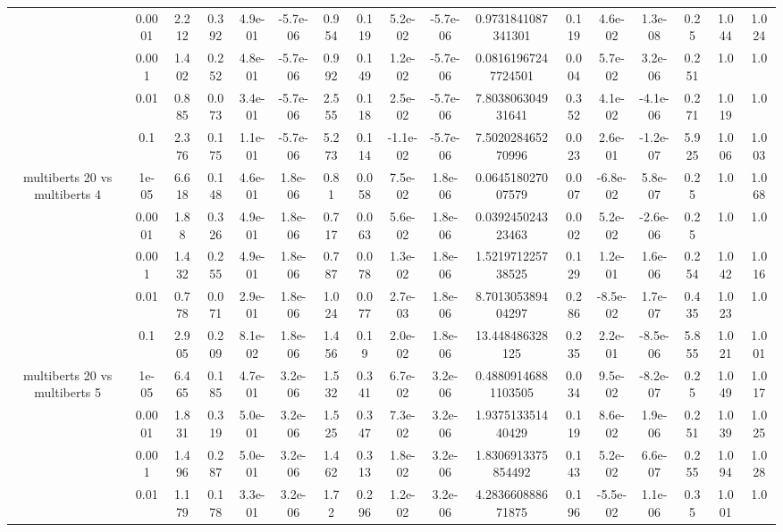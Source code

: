\begin{tabular}{|c|c|c|c|c|c|c|c|c|c|c|c|c|c|c|c|c|}
 & 0.0001 & 2.212 & 0.392 & 4.9e-01 & -5.7e-06 & 0.954 & 0.119 & 5.2e-02 & -5.7e-06 & 0.9731841087341301 & 0.119 & 4.6e-02 & 1.3e-08 & 0.25 & 1.044 & 1.024 \\
 & 0.001 & 1.402 & 0.252 & 4.8e-01 & -5.7e-06 & 0.992 & 0.149 & 1.2e-02 & -5.7e-06 & 0.08161967247724501 & 0.004 & 5.7e-02 & 3.2e-06 & 0.251 & 1.0 & 1.0 \\
 & 0.01 & 0.885 & 0.073 & 3.4e-01 & -5.7e-06 & 2.555 & 0.118 & 2.5e-02 & -5.7e-06 & 7.803806304931641 & 0.352 & 4.1e-02 & -4.1e-06 & 0.271 & 1.019 & 1.0 \\
 & 0.1 & 2.376 & 0.175 & 1.1e-01 & -5.7e-06 & 5.273 & 0.114 & -1.1e-02 & -5.7e-06 & 7.502028465270996 & 0.023 & 2.6e-01 & -1.2e-07 & 5.925 & 1.006 & 1.003 \\
\hline
\multirow{5}{*}{multiberts 20 vs multiberts 4} & 1e-05 & 6.618 & 0.148 & 4.6e-01 & 1.8e-06 & 0.81 & 0.058 & 7.5e-02 & 1.8e-06 & 0.064518027007579 & 0.007 & -6.8e-02 & 5.8e-07 & 0.25 & 1.0 & 1.068 \\
 & 0.0001 & 1.88 & 0.326 & 4.9e-01 & 1.8e-06 & 0.717 & 0.063 & 5.6e-02 & 1.8e-06 & 0.039245024323463 & 0.002 & 5.2e-02 & -2.6e-06 & 0.25 & 1.0 & 1.0 \\
 & 0.001 & 1.432 & 0.255 & 4.9e-01 & 1.8e-06 & 0.787 & 0.078 & 1.3e-02 & 1.8e-06 & 1.521971225738525 & 0.129 & 1.2e-01 & 1.6e-06 & 0.254 & 1.042 & 1.016 \\
 & 0.01 & 0.778 & 0.071 & 2.9e-01 & 1.8e-06 & 1.024 & 0.077 & 2.7e-03 & 1.8e-06 & 8.701305389404297 & 0.286 & -8.5e-02 & 1.7e-07 & 0.435 & 1.023 & 1.0 \\
 & 0.1 & 2.905 & 0.209 & 8.1e-02 & 1.8e-06 & 1.456 & 0.19 & 2.0e-02 & 1.8e-06 & 13.448486328125 & 0.235 & 2.2e-01 & -8.5e-06 & 5.855 & 1.021 & 1.001 \\
\hline
\multirow{5}{*}{multiberts 20 vs multiberts 5} & 1e-05 & 6.465 & 0.185 & 4.7e-01 & 3.2e-06 & 1.532 & 0.341 & 6.7e-02 & 3.2e-06 & 0.48809146881103505 & 0.034 & 9.5e-02 & -8.2e-07 & 0.25 & 1.049 & 1.017 \\
 & 0.0001 & 1.831 & 0.319 & 5.0e-01 & 3.2e-06 & 1.525 & 0.347 & 7.3e-02 & 3.2e-06 & 1.937513351440429 & 0.119 & 8.6e-02 & 1.9e-06 & 0.251 & 1.039 & 1.025 \\
 & 0.001 & 1.496 & 0.287 & 5.0e-01 & 3.2e-06 & 1.462 & 0.313 & 1.8e-02 & 3.2e-06 & 1.8306913375854492 & 0.143 & 5.2e-02 & 6.6e-07 & 0.255 & 1.094 & 1.028 \\
 & 0.01 & 1.179 & 0.178 & 3.3e-01 & 3.2e-06 & 1.72 & 0.296 & 1.2e-02 & 3.2e-06 & 4.283660888671875 & 0.196 & -5.5e-02 & 1.1e-06 & 0.35 & 1.001 & 1.0 \\

\end{tabular}
